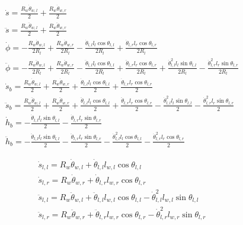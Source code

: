 \begin{gather}
  \dot{s} = \frac{R_w\dot{\theta}_{w,l}}{2}+\frac{R_w\dot{\theta}_{w,r}}{2} \\
  \ddot{s} = \frac{R_w\ddot{\theta}_{w,l}}{2}+\frac{R_w\ddot{\theta}_{w,r}}{2} \\
  \dot{\phi} =
  -\frac{R_w\dot{\theta}_{w,l}}{2R_l}
  +\frac{R_w\dot{\theta}_{w,r}}{2R_l}
  -\frac{\dot{\theta}_{l,l}l_l\cos\theta_{l,l}}{2R_l}
  +\frac{\dot{\theta}_{l,r}l_r\cos\theta_{l,r}}{2R_l} \\
  \ddot{\phi} =
  -\frac{R_w\ddot{\theta}_{w,l}}{2R_l}
  +\frac{R_w\ddot{\theta}_{w,r}}{2R_l}
  -\frac{\ddot{\theta}_{l,l}l_l\cos\theta_{l,l}}{2R_l}
  +\frac{\ddot{\theta}_{l,r}l_r\cos\theta_{l,r}}{2R_l}
  +\frac{\dot{\theta}_{l,l}^2l_l\sin\theta_{l,l}}{2R_l}
  -\frac{\dot{\theta}_{l,r}^2l_r\sin\theta_{l,r}}{2R_l} \\
  \dot{s}_b =
  \frac{R_w\dot{\theta}_{w,l}}{2}
  +\frac{R_w\dot{\theta}_{w,r}}{2}
  +\frac{\dot{\theta}_{l,l}l_l\cos\theta_{l,l}}{2}
  +\frac{\dot{\theta}_{l,r}l_r\cos\theta_{l,r}}{2} \\
  \ddot{s}_b =
  \frac{R_w\ddot{\theta}_{w,l}}{2}
  +\frac{R_w\ddot{\theta}_{w,r}}{2}
  +\frac{\ddot{\theta}_{l,l}l_l\cos\theta_{l,l}}{2}
  +\frac{\ddot{\theta}_{l,r}l_r\cos\theta_{l,r}}{2}
  -\frac{\dot{\theta}_{l,l}^2l_l\sin\theta_{l,l}}{2}
  -\frac{\dot{\theta}_{l,r}^2l_r\sin\theta_{l,r}}{2} \\
  \dot{h}_b =
  -\frac{\dot{\theta}_{l,l}l_l\sin\theta_{l,l}}{2}
  -\frac{\dot{\theta}_{l,r}l_r\sin\theta_{l,r}}{2} \\
  \ddot{h}_b =
  -\frac{\ddot{\theta}_{l,l}l_l\sin\theta_{l,l}}{2}
  -\frac{\ddot{\theta}_{l,r}l_r\sin\theta_{l,r}}{2}
  -\frac{\dot{\theta}_{l,l}^2l_l\cos\theta_{l,l}}{2}
  -\frac{\dot{\theta}_{l,r}^2l_r\cos\theta_{l,r}}{2}
\end{gather}

\begin{gather}
  \dot{s}_{l,l} = R_w\dot{\theta}_{w,l}+\dot{\theta}_{l,l}l_{w,l}\cos\theta_{l,l} \\
  \dot{s}_{l,r} = R_w\dot{\theta}_{w,r}+\dot{\theta}_{l,r}l_{w,r}\cos\theta_{l,r} \\
  \ddot{s}_{l,l} = R_w\ddot{\theta}_{w,l}
  +\ddot{\theta}_{l,l}l_{w,l}\cos\theta_{l,l}
  -\dot{\theta}_{l,l}^2l_{w,l}\sin\theta_{l,l} \\
  \ddot{s}_{l,r} = R_w\ddot{\theta}_{w,r}
  +\ddot{\theta}_{l,r}l_{w,r}\cos\theta_{l,r}
  -\dot{\theta}_{l,r}^2l_{w,r}\sin\theta_{l,r}
\end{gather}

